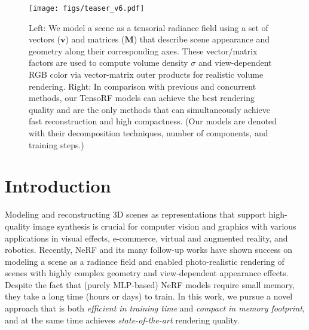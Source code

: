 \documentclass[runningheads]{llncs}
\begin{document}
\newcommand{\Tensor}{\mathcal{T}}
\newcommand{\Vector}{\mathbf{v}}
\newcommand{\Matrix}{\mathbf{M}}
\newcommand{\AppVec}{\mathbf{b}}
\newcommand{\AppMat}{\mathbf{B}}
\newcommand{\VectorPack}{\mathbf{V}}
\newcommand{\RRR}{\mathbb{R}}
\newcommand{\DimIJK}{I\times J\times K}
\newcommand{\DimCh}{P}


\newcommand{\OuterP}{\circ}
\newcommand{\ScalarP}{\ast}
\newcommand{\Pos}{\mathbf{x}}
\newcommand{\Dens}{\sigma}
\newcommand{\Rad}{c}
\newcommand{\Color}{C}
\newcommand{\Trans}{\tau}
\newcommand{\Step}{\Delta}
\newcommand{\Comp}{\mathcal{A}}
\newcommand{\Dir}{d}
\newcommand{\Grid}{\mathcal{G}}
\newcommand{\ShadFunc}{S}
\newcommand{\loss}{\mathcal{L}}

\begin{figure}[t]
    \texttt{[image: figs/teaser\_v6.pdf]}
    \vspace{-5mm}
    \caption{
    Left: We model a scene as a tensorial radiance field using a set of vectors ($\Vector$) and matrices ($\Matrix$) that describe scene appearance and geometry along their corresponding axes. These vector/matrix factors are used to compute volume density $\Dens$ and view-dependent RGB color via vector-matrix outer products for realistic volume rendering.
    Right: In comparison with previous and concurrent methods, our TensoRF models can achieve the best rendering quality and are the only methods that can simultaneously achieve fast reconstruction and high compactness. (Our models are denoted with their decomposition techniques, number of components, and training steps.)
} \vspace{-5mm}
    \label{fig:teaser}
\end{figure}

\section{Introduction}

Modeling and reconstructing 3D scenes as representations that support high-quality image synthesis is crucial for computer vision and graphics with various applications in visual effects, e-commerce, virtual and augmented reality, and robotics.
Recently, NeRF \cite{mildenhall2020nerf} and its many follow-up works \cite{zhang2020nerf++,liu2020neural} have shown success on modeling a scene as a radiance field 
and enabled photo-realistic rendering of scenes with highly complex geometry and view-dependent appearance effects. Despite the fact that (purely MLP-based) NeRF models require small memory, they take a long time (hours or days) to train. In this work, we pursue a novel approach that is both \emph{efficient in training time} and \emph{compact in memory footprint}, and at the same time achieves \emph{state-of-the-art} rendering quality.
\end{document}
